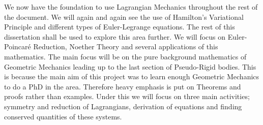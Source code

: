 \noindent
We now have the foundation to use Lagrangian Mechanics throughout the rest of the document. We will again and again see the use of Hamilton's Variational Principle and different types of Euler-Legrange equations. The rest of this dissertation shall be used to explore this area further. We will focus on Euler-Poincar\'e Reduction, Noether Theory and several applications of this mathematics. The main focus will be on the pure background mathematics of Geometric Mechanics leading up to the last section of Pseudo-Rigid bodies. This is because the main aim of this project was to learn enough Geometric Mechanics to do a PhD in the area. Therefore heavy emphasis is put on Theorems and proofs rather than examples. Under this we will focus on three main activities; symmetry and reduction of Lagrangians, derivation of equations and finding conserved quantities of these systems.

